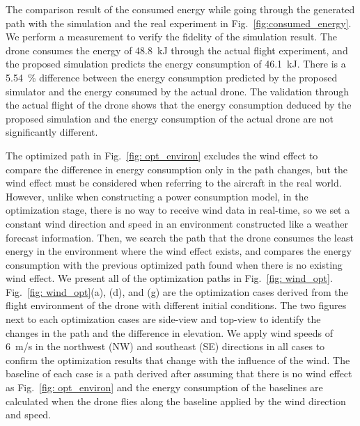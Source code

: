 \documentclass[journal]{./template/IEEEtran}
\begin{document}
The comparison result of the consumed energy while going through the generated path with the simulation and the real experiment in Fig.~\ref{fig:consumed_energy}. 
We perform a measurement to verify the fidelity of the simulation result.
The drone consumes the energy of 48.8~kJ through the actual flight experiment, and the proposed simulation predicts the energy consumption of 46.1~kJ.
There is a 5.54~\% difference between the energy consumption predicted by the proposed simulator and the energy consumed by the actual drone.
The validation through the actual flight of the drone shows that the energy consumption deduced by the proposed simulation and the energy consumption of the actual drone are not significantly different.

The optimized path in Fig.~\ref{fig: opt_environ} excludes the wind effect to compare the difference in energy consumption only in the path changes, but the wind effect must be considered when referring to the aircraft in the real world.
However, unlike when constructing a power consumption model, in the optimization stage, there is no way to receive wind data in real-time, so we set a constant wind direction and speed in an environment constructed like a weather forecast information.
Then, we search the path that the drone consumes the least energy in the environment where the wind effect exists, and compares the energy consumption with the previous optimized path found when there is no existing wind effect.
We present all of the optimization paths in Fig.~\ref{fig: wind_opt}. 
Fig.~\ref{fig: wind_opt}(a), (d), and (g) are the optimization cases derived from the flight environment of the drone with different initial conditions. 
The two figures next to each optimization cases are side-view and top-view to identify the changes in the path and the difference in elevation.  
We apply wind speeds of 6~m/s in the northwest (NW) and southeast (SE) directions in all cases to confirm the optimization results that change with the influence of the wind.
The baseline of each case is a path derived after assuming that there is no wind effect as Fig.~\ref{fig: opt_environ} and the energy consumption of the baselines are calculated when the drone flies along the baseline applied by the wind direction and speed.
\end{document}
